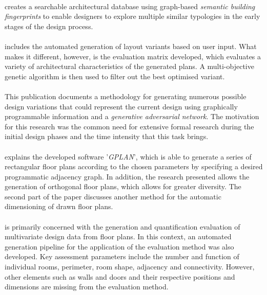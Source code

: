\documentclass[a4paper, 12pt]{report}
\begin{document}
\paragraph{\cite{thurow2016assisting}} creates a searchable architectural database using graph-based \textit{semantic building fingerprints} to enable designers to explore multiple similar typologies in the early stages of the design process.

\paragraph{\cite{nagy2017project}} includes the automated generation of layout variants based on user input. What makes it different, however, is the evaluation matrix developed, which evaluates a variety of architectural characteristics of the generated plans. A multi-objective genetic algorithm is then used to filter out the best optimised variant.

\paragraph{\cite{eisenstadt2019generation}} This publication documents a methodology for generating numerous possible design variations that could represent the current design using graphically programmable information and a \textit{generative adversarial network}. The motivation for this research was the common need for extensive formal research during the initial design phases and the time intensity that this task brings.

\paragraph{\cite{shekhawat2020gplan}} explains the developed software '\textit{GPLAN}', which is able to generate a series of rectangular floor plans according to the chosen parameters by specifying a desired programmatic adjacency graph. In addition, the research presented allows the generation of orthogonal floor plans, which allows for greater diversity. The second part of the paper discusses another method for the automatic dimensioning of drawn floor plans.

\paragraph{\cite{son2021framework}} is primarily concerned with the generation and quantification evaluation of multivariate design data from floor plans. In this context, an automated generation pipeline for the application of the evaluation method was also developed. Key assessment parameters include the number and function of individual rooms, perimeter, room shape, adjacency and connectivity. However, other elements such as walls and doors and their respective positions and dimensions are missing from the evaluation method.
\end{document}

